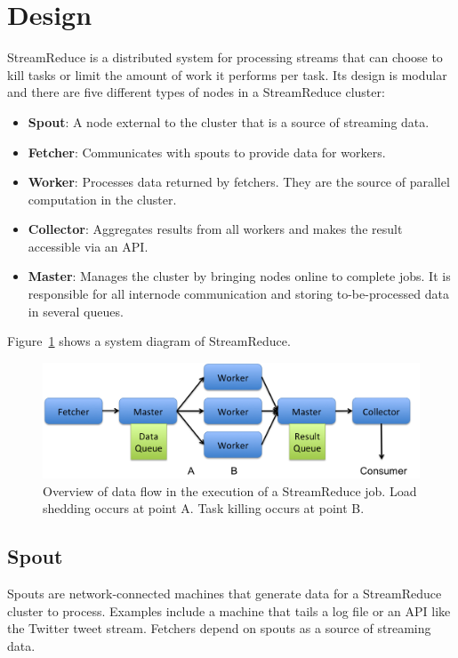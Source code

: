 \documentclass[12pt,twocolumn]{article}
\begin{document}
\section{Design}
\label{sec:design}
StreamReduce is a distributed system for processing streams that can choose to kill tasks or
limit the amount of work it performs per task. Its design is modular and there are five
different types of nodes in a StreamReduce cluster:
\begin{itemize}
  \item
    \textbf{Spout}: A node external to the cluster that is a source of streaming data.
  \item
    \textbf{Fetcher}: Communicates with spouts to provide data for workers.
  \item
    \textbf{Worker}: Processes data returned by fetchers. They are the source of parallel
computation
    in the cluster.
  \item
    \textbf{Collector}: Aggregates results from all workers and makes the result accessible via
an API.
  \item
    \textbf{Master}: Manages the cluster by bringing nodes online to complete jobs. It is
responsible
    for all internode communication and storing to-be-processed data in several queues.
\end{itemize}
Figure~\ref{fig:systemdiagram} shows a system diagram of StreamReduce.

\begin{figure}
\includegraphics[width=\textwidth]{system-diagram.png}
\caption{Overview of data flow in the execution of a StreamReduce job. Load shedding
occurs at point A. Task killing occurs at point B.}
\label{fig:systemdiagram}
\end{figure}

\subsection{Spout}
Spouts are network-connected machines that generate data for a StreamReduce cluster to
process.
Examples include a machine that tails a log file or an API like the Twitter tweet
stream. Fetchers depend on spouts as a source of streaming data.
\end{document}
